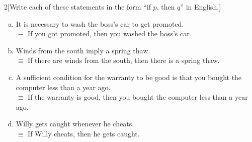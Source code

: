 \documentclass[11pt]{article}
\begin{document}
\vspace*{0pt}

\begin{problem}{2}[Write each of these statements in the form ``if $p$, then $q$'' in English.]
\begin{enumerate}[(a)]
\item It is necessary to wash the boss's car to get promoted.\\
  $\equiv$ If you got promoted, then you washed the boss's car.
  
\item Winds from the south imply a spring thaw.\\
  $\equiv$ If there are winds from the south, then there is a spring thaw.
  
\item A sufficient condition for the warranty to be good is that you bought the computer less than a year ago.\\
  $\equiv$ If the warranty is good, then you bought the computer less than a year ago.
  
\item Willy gets caught whenever he cheats.\\
  $\equiv$ If Willy cheats, then he gets caught.
  
\end{enumerate}
\end{problem}

\vspace*{0pt}
\end{document}
